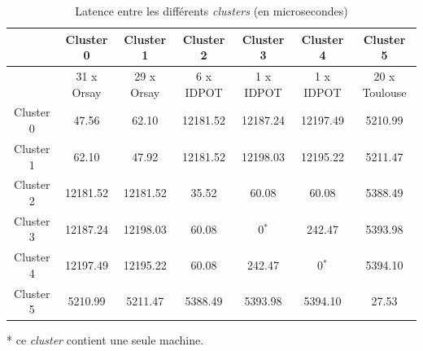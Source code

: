 \begin{table}
	\caption{\label{Tableau: Latence grid 1}Latence entre les différents \textit{clusters}
		(en microsecondes)}
	
	
	\begin{centering}
		{\footnotesize }\begin{tabular}{|c||c|c|c|c|c|c|}
			\hline 
			& {\footnotesize  Cluster 0} & {\footnotesize  Cluster 1} & {\footnotesize  Cluster 2} & {\footnotesize Cluster 3} & {\footnotesize  Cluster 4} & {\footnotesize  Cluster 5}\tabularnewline
			\hline 
			& {\footnotesize 31 x Orsay} & {\footnotesize 29 x Orsay} & {\footnotesize 6 x IDPOT} & {\footnotesize 1 x IDPOT} & {\footnotesize 1 x IDPOT} & {\footnotesize 20 x Toulouse}\tabularnewline
			\hline
			\hline 
			{\footnotesize  Cluster 0} & {\footnotesize 47.56} & {\footnotesize 62.10} & {\footnotesize 12181.52} & {\footnotesize 12187.24} & {\footnotesize 12197.49} & {\footnotesize 5210.99}\tabularnewline
			\hline 
			{\footnotesize  Cluster 1} & {\footnotesize 62.10} & {\footnotesize 47.92} & {\footnotesize 12181.52} & {\footnotesize 12198.03} & {\footnotesize 12195.22} & {\footnotesize 5211.47}\tabularnewline
			\hline 
			{\footnotesize  Cluster 2} & {\footnotesize 12181.52} & {\footnotesize 12181.52} & {\footnotesize 35.52} & {\footnotesize 60.08} & {\footnotesize 60.08} & {\footnotesize 5388.49}\tabularnewline
			\hline 
			{\footnotesize  Cluster 3} & {\footnotesize 12187.24} & {\footnotesize 12198.03} & {\footnotesize 60.08} & {\footnotesize 0$^{*}$} & {\footnotesize 242.47} & {\footnotesize 5393.98}\tabularnewline
			\hline 
			{\footnotesize  Cluster 4} & {\footnotesize 12197.49} & {\footnotesize 12195.22} & {\footnotesize 60.08} & {\footnotesize 242.47} & {\footnotesize 0$^{*}$} & {\footnotesize 5394.10}\tabularnewline
			\hline 
			{\footnotesize  Cluster 5} & {\footnotesize 5210.99} & {\footnotesize 5211.47} & {\footnotesize 5388.49} & {\footnotesize 5393.98} & {\footnotesize 5394.10} & {\footnotesize 27.53}\tabularnewline
			\hline
		\end{tabular}
		\par\end{centering}{\footnotesize \par}
	
	\begin{centering}
		{\footnotesize {*} ce \textit{cluster} contient une seule machine.}
		\par\end{centering}
\end{table}


